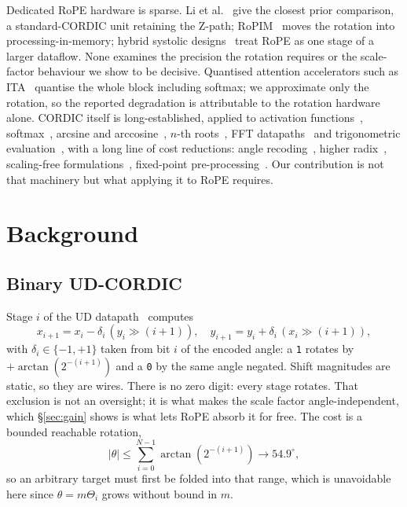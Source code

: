\documentclass[conference]{IEEEtran}
\begin{document}
Dedicated RoPE hardware is sparse. Li et al.~\cite{standard_cordic_rope} give
the closest prior comparison, a standard-CORDIC unit retaining the Z-path;
RoPIM~\cite{c23} moves the rotation into processing-in-memory; hybrid systolic
designs~\cite{c6} treat RoPE as one stage of a larger dataflow. None examines
the precision the rotation requires or the scale-factor behaviour we show to be
decisive. Quantised attention accelerators such as ITA~\cite{c14} quantise the
whole block including softmax; we approximate only the rotation, so the reported
degradation is attributable to the rotation hardware alone. CORDIC itself is
long-established, applied to activation
functions~\cite{c16,c18,c19,c22,work1,work2}, softmax~\cite{c8,c17},
arcsine and arccosine~\cite{c5,c20,c21}, $n$-th roots~\cite{c15}, FFT
datapaths~\cite{c11} and trigonometric evaluation~\cite{c2,c3,c4}, with a long
line of cost reductions: angle recoding~\cite{c1}, higher radix~\cite{c10},
scaling-free formulations~\cite{c12}, fixed-point
pre-processing~\cite{work3,c13}. Our
contribution is not that machinery but what applying it to RoPE requires.

\section{Background}

\subsection{Binary UD-CORDIC}
\label{sec:binaryud}

Stage $i$ of the UD datapath~\cite{ud} computes
\begin{equation}
  x_{i+1} = x_i - \delta_i\,(y_i \gg (i{+}1)), \quad
  y_{i+1} = y_i + \delta_i\,(x_i \gg (i{+}1)),
  \label{eq:binstage}
\end{equation}
with $\delta_i \in \{-1,+1\}$ taken from bit $i$ of the encoded angle: a
\texttt{1} rotates by $+\arctan(2^{-(i+1)})$ and a \texttt{0} by the same angle
negated. Shift magnitudes are static, so they are wires. There is no zero
digit: every stage rotates. That exclusion is not an oversight; it is what
makes the scale factor angle-independent, which \S\ref{sec:gain} shows is
what lets RoPE absorb it for free. The cost is a bounded reachable rotation,
\begin{equation}
  |\theta| \le \textstyle\sum_{i=0}^{N-1}\arctan(2^{-(i+1)}) \to 54.9^{\circ},
  \label{eq:binrange}
\end{equation}
so an arbitrary target must first be folded into that range, which is
unavoidable here since $\theta = m\Theta_i$ grows without bound in $m$.
\end{document}

